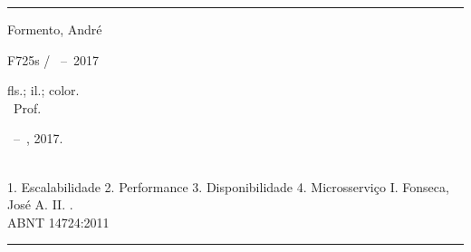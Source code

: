 %
%     
\begin{fichacatalografica}
	\vspace*{\fill}					%
	\hrule							%
	\begin{center}					%
	\begin{minipage}[c]{12.5cm}		%

	Formento, André

    \hspace{-1.4cm} F725s
    \hspace{0.79cm} \imprimirtitulo  / \imprimirautor~--~2017

    \hspace{0.5cm} \cfoot{{\hypersetup{linkcolor=black}\pageref{LastPage}}}fls.; il.; color.\\

	\hspace{0.5cm} \imprimirorientadorRotulo~Prof. \imprimirorientador\\

	\hspace{0.5cm} \parbox[t]{\textwidth}{\imprimirtipotrabalho~--~\imprimirinstituicao, 2017.}\\

	\hspace{0.5cm}
		1. Escalabilidade
		2. Performance
		3. Disponibilidade
		4. Microsserviço
		I. Fonseca, José A.
		II. \imprimirtitulo.\\

	\hspace{8.75cm} ABNT 14724:2011\\

	\end{minipage}
	\end{center}
	\hrule
\end{fichacatalografica}
